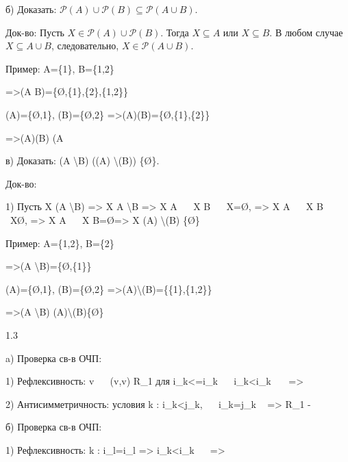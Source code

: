 \documentclass[12pt]{article}
\begin{document}
\item б) Доказать: \(\mathcal{P}(A) \cup \mathcal{P}(B) \subseteq \mathcal{P}(A \cup B)\).

Док-во: Пусть \(X \in \mathcal{P}(A) \cup \mathcal{P}(B)\). Тогда \(X \subseteq A\) или \(X \subseteq B\). В любом случае \(X \subseteq A \cup B\), следовательно, \(X \in \mathcal{P}(A \cup B)\).

Пример: A=\{1\}, B=\{1,2\}

=>(A \cup B)=\{\O,\{1\},\{2\},\{1,2\}\}

(A)=\{\O,1\}, (B)=\{\O,2\} =>(A)\cup {}(B)=\{\O,\{1\},\{2\}\}

=>(A)\cup {}(B) \subset {}(A \cup 

\item в) Доказать: (A \backslash B) \subseteq ((A) \backslash {}(B)) \cup \{\O\}.

Док-во: 

1) Пусть X \in {}(A \backslash B) => X \subseteq A \backslash B => X \subseteq A \  \ X \nsubseteq B \ 
 \ X=\O, => X \subseteq A \  \ X \subseteq B \ 
 \ X\neq\O, => X \subseteq A \  \ X \cap B=\O => X \in {}(A) \backslash {}(B) \cup \{\O\}

Пример: A=\{1,2\}, B=\{2\}

=>(A \backslash B)=\{\O,\{1\}\}

(A)=\{\O,1\}, (B)=\{\O,2\} =>(A)\backslash \mathcal{P}(B)=\{\{1\},\{1,2\}\}

=>\mathcal{P}(A \backslash B) \subset \mathcal{P}(A)\backslash \mathcal{P}(B)\cup \{\O\}

\item1.3
\item a) Проверка св-в ОЧП:

    1) Рефлексивность:  \forall v \  \ (v,v) \in R_1
    для i_k<=i_k \  \ i_k<i_k\ \  \
    => \ 

    2) Антисимметричность: условия \exists k : i_k<j_k, \ \text{и} \ i_k=j_k \  
=> R_1 - \ \text{не ОЧП} \ 


\item б) Проверка св-в ОЧП: \

    1) Рефлексивность: \exists k : i_l=i_l => i_k<i_k \  \
    => \ 
\end{document}
